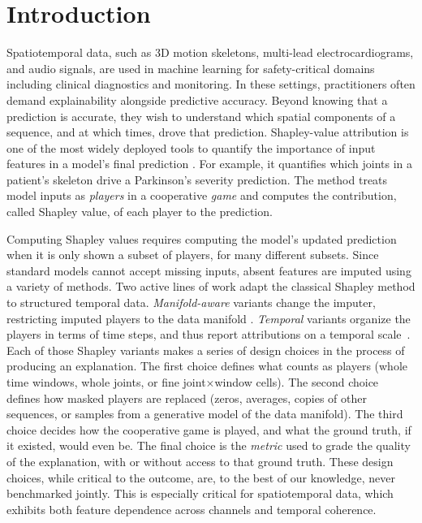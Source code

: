 \section{Introduction}
\label{sec:intro}

Spatiotemporal data, such as 3D motion skeletons, multi-lead electrocardiograms, and audio signals, are used in machine learning for safety-critical domains including clinical diagnostics and monitoring. In these settings, practitioners often demand explainability alongside predictive accuracy. Beyond knowing that a prediction is accurate, they wish to understand which spatial components of a sequence, and at which times, drove that prediction.
%
Shapley-value attribution \citep{shapley1953value,lundberg2017unified} is
one of the most widely deployed tools to quantify the importance of input features in a model's final prediction
\citep{arrieta2020explainable,slack2020fooling}. For example, it quantifies which joints in a patient's skeleton drive a Parkinson's severity prediction. The method treats model inputs as \textit{players} in a cooperative \textit{game} and computes the contribution, called Shapley value, of each player to the prediction.

Computing Shapley values requires computing the model's updated prediction when it is only shown a subset of players, for many different subsets. Since standard models cannot accept missing inputs, absent features are imputed using a variety of methods. Two active lines of work adapt the classical Shapley method to structured temporal data. \emph{Manifold-aware} variants change the imputer, restricting imputed players to the data manifold
\citep{frye2021shapley,aas2021explaining,olsen2022using,taufiq2023manifold, zhang2026axiomatic}.  \emph{Temporal} variants organize the players in terms of time steps, and thus report attributions on a temporal scale~\citep{bento2021timeshap,NAYEBI2023104438,villani2022feature,
de2025shats}.
%
Each of those Shapley variants makes a series of design choices in the process of producing an explanation. The first choice defines what counts as players (whole time windows, whole joints, or fine joint$\times$window cells). The second choice defines how masked players are replaced (zeros, averages, copies of other sequences, or samples from a generative model of the data manifold). The third choice decides how the cooperative game is played, and what the ground truth, if it existed, would even be. The final choice is the \emph{metric} used to grade the quality of the explanation, with or without access to that ground truth.
%
%
These design choices, while critical to the outcome, are, to the best of our knowledge, never benchmarked jointly. This is especially critical for spatiotemporal data, which exhibits both feature dependence across channels and temporal coherence. 



